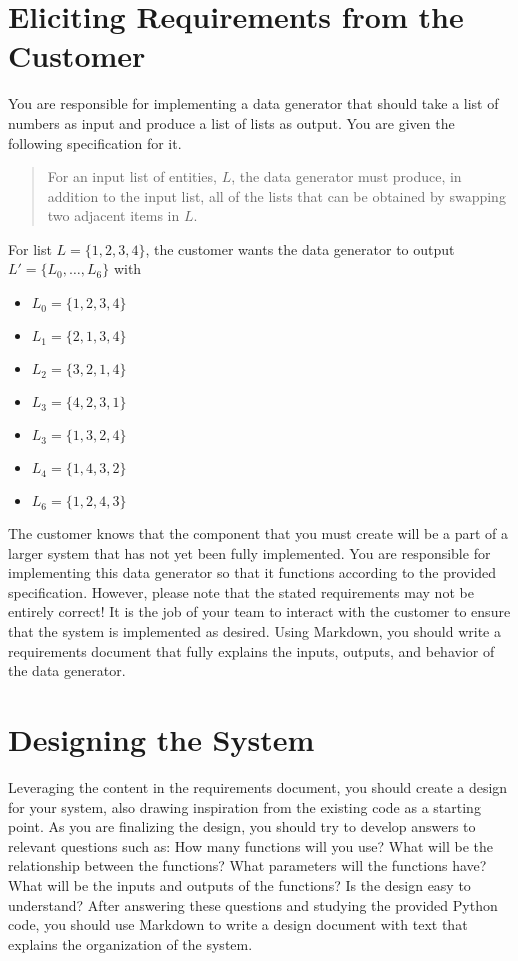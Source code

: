 \documentclass[11pt]{article}
\begin{document}
\section*{Eliciting Requirements from the Customer}

You are responsible for implementing a data generator that should take a list of numbers as input and produce a list of
lists as output. You are given the following specification for it.

\begin{quote}

For an input list of entities, $L$, the data generator must produce, in addition to the input list, all of the lists
that can be obtained by swapping two adjacent items in $L$.

\end{quote}

\noindent
For list $L = \{1, 2, 3, 4\}$, the customer wants the data generator to output $L'=\{L_0, \ldots, L_6\}$ with

\begin{itemize}
  \itemsep 0in
  \item[] $L_0 = \{1, 2, 3, 4\}$
  \item[] $L_1 = \{2, 1, 3, 4\}$
  \item[] $L_2 = \{3, 2, 1, 4\}$
  \item[] $L_3 = \{4, 2, 3, 1\}$
  \item[] $L_3 = \{1, 3, 2, 4\}$
  \item[] $L_4 = \{1, 4, 3, 2\}$
  \item[] $L_6 = \{1, 2, 4, 3\}$
\end{itemize}

The customer knows that the component that you must create will be a part of a larger system that has not yet been
fully implemented. You are responsible for implementing this data generator so that it functions according to the
provided specification. However, please note that the stated requirements may not be entirely correct! It is the job
of your team to interact with the customer to ensure that the system is implemented as desired. Using Markdown, you
should write a requirements document that fully explains the inputs, outputs, and behavior of the data generator.

\section*{Designing the System}

Leveraging the content in the requirements document, you should create a design for your system, also drawing
inspiration from the existing code as a starting point. As you are finalizing the design, you should try to develop
answers to relevant questions such as: How many functions will you use? What will be the relationship between the
functions? What parameters will the functions have? What will be the inputs and outputs of the functions? Is the design
easy to understand? After answering these questions and studying the provided Python code, you should use Markdown to
write a design document with text that explains the organization of the system.
\end{document}
